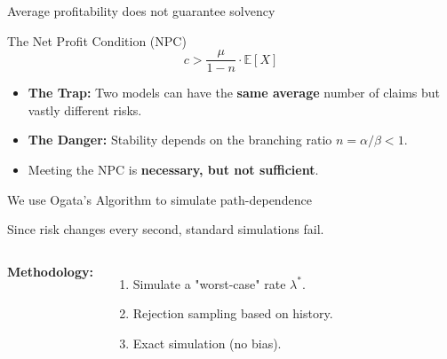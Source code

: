 \documentclass[aspectratio=43, 10pt]{beamer}
\begin{document}
\begin{frame}{Average profitability does not guarantee solvency}
    
    \begin{block}{The Net Profit Condition (NPC)}
        $$ c > \frac{\mu}{1-n} \cdot \mathbb{E}[X] $$
    \end{block}
    
    \vspace{0.5cm}
    
    \begin{itemize}
        \item \textbf{The Trap:} Two models can have the \textbf{same average} number of claims but vastly different risks.
        \item \textbf{The Danger:} Stability depends on the branching ratio $n = \alpha/\beta < 1$.
        \item Meeting the NPC is \textbf{necessary, but not sufficient}.
    \end{itemize}
\end{frame}

\begin{frame}{We use Ogata's Algorithm to simulate path-dependence}

    Since risk changes every second, standard simulations fail.
    
    \vspace{1em}
    
    \begin{columns}
        \textbf{Methodology:}
        \begin{enumerate}
            \item Simulate a "worst-case" rate $\lambda^*$.
            \item Rejection sampling based on history.
            \item Exact simulation (no bias).
        \end{enumerate}

        \centering
    \end{columns}
\end{frame}
\end{document}
